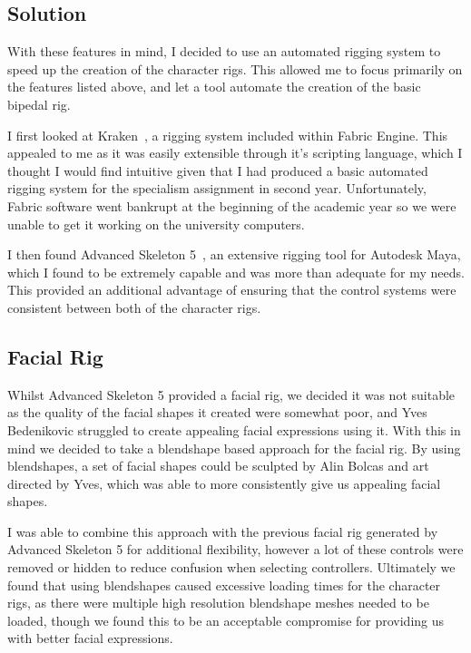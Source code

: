 \documentclass[11pt]{article}
\begin{document}
\subsection{Solution}

With these features in mind, I decided to use an automated rigging system to speed up the creation of the character rigs. This allowed me to focus primarily on the features listed above, and let a tool automate the creation of the basic bipedal rig.

I first looked at Kraken~\cite{kraken}, a rigging system included within Fabric Engine. This appealed to me as it was easily extensible through it's scripting language, which I thought I would find intuitive given that I had produced a basic automated rigging system for the specialism assignment in second year. Unfortunately, Fabric software went bankrupt at the beginning of the academic year so we were unable to get it working on the university computers.

I then found Advanced Skeleton 5~\cite{advancedSkeleton}, an extensive rigging tool for Autodesk Maya, which I found to be extremely capable and was more than adequate for my needs. This provided an additional advantage of ensuring that the control systems were consistent between both of the character rigs.

\subsection{Facial Rig}

Whilst Advanced Skeleton 5 provided a facial rig, we decided it was not suitable as the quality of the facial shapes it created were somewhat poor, and Yves Bedenikovic struggled to create appealing facial expressions using it. With this in mind we decided to take a blendshape based approach for the facial rig. By using blendshapes, a set of facial shapes could be sculpted by Alin Bolcas and art directed by Yves, which was able to more consistently give us appealing facial shapes.

I was able to combine this approach with the previous facial rig generated by Advanced Skeleton 5 for additional flexibility, however a lot of these controls were removed or hidden to reduce confusion when selecting controllers. Ultimately we found that using blendshapes caused excessive loading times for the character rigs, as there were multiple high resolution blendshape meshes needed to be loaded, though we found this to be an acceptable compromise for providing us with better facial expressions.
\end{document}
